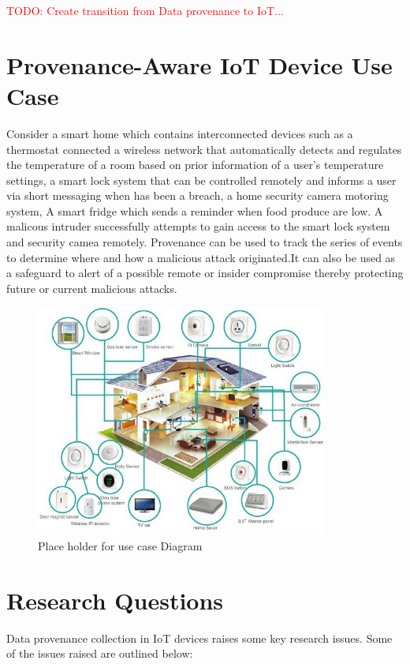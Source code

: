   \textcolor{red}{TODO: Create transition from Data provenance to IoT...}


\section{Provenance-Aware IoT Device Use Case}

Consider a smart home which contains interconnected devices such as a thermostat connected a wireless network that automatically detects and regulates the temperature of a room based on prior information of a user's temperature settings, a smart lock system that can be controlled remotely and informs a user via short messaging when has been a breach, a home security camera motoring system, A smart fridge which sends a reminder when food produce are low. A malicous intruder successfully attempts  to gain access to the smart lock system and security camea remotely. Provenance can be used to track the series  of events to determine where and how a malicious attack originated.It can also be used as a safeguard to alert of a possible remote or insider compromise thereby protecting future or current malicious attacks.

\begin{figure}[h!]
\begin{center}

\includegraphics[height=3in]{smarthome-diagram.png}
\end{center}
\caption{Place holder for use case Diagram}

\end{figure}


\section{Research Questions}
Data provenance collection in IoT devices raises some key research issues. Some of the issues raised are outlined below:

